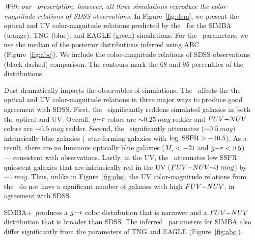 \emph{With our \eda~prescription, however, all three simulations reproduce the
color-magnitude relations of SDSS observations.} In Figure~\ref{fig:dem}, 
we present the optical and UV color-magnitude relations predicted by the 
\eda~for the SIMBA (orange), TNG (blue), and EAGLE (green) simulations. 
For the \eda~parameters, we use the median of the posterior distributions 
inferred using ABC (Figure~\ref{fig:abc}). We include the color-magnitude
relations of SDSS observations (black-dashed) comparison. The contours mark 
the $68$ and $95$ percentiles of the distributions. 

Dust dramatically impacts the observables of simulations. The \eda~affects the 
the optical and UV color-magnitude relations in three major ways to produce
good agreement with SDSS. 
First, the \eda~significantly reddens simulated galaxies in both the optical
and UV. Overall, $g{-}r$ colors are ${\sim}0.25~mag$ redder and $FUV{-}NUV$ colors
are ${\sim}0.5~mag$ redder. 
Second, the \eda~significantly attenuates (${\sim}0.5~mag$) intrinsically blue
galaxies (\ie~star-forming galaxies with $\log~{\rm SSFR} > -10.5$). As a
result, there are no luminous optically blue galaxies ($M_r < -21$ and $g{-}r <
0.5$) --- consistent with observations.
Lastly, in the UV, the \eda~attenuates low SSFR quiescent galaxies that are 
intrinsically red in the UV ($FUV{-}NUV{\sim}3~mag$) by ${\sim}1~mag$. Thus, unlike in
Figure~\ref{fig:obs}, the UV color-magnitude relations from the \eda~do not
have a significant number of galaxies with high $FUV{-}NUV$, in agreement with SDSS.

SIMBA+\eda~produces a $g{-}r$ color distribution that is narrower and a $FUV{-}NUV$
distribution that is broader than SDSS. The inferred \eda~parameters for SIMBA
also differ significantly from the parameters of TNG and EAGLE
(Figure~\ref{fig:abc}). 


